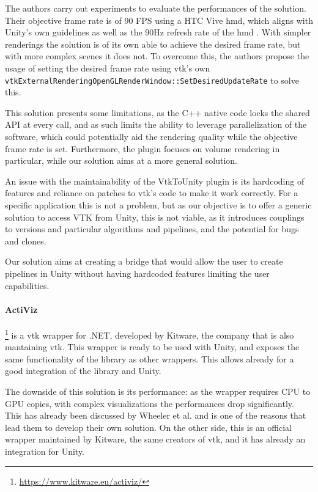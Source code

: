 The authors carry out experiments to evaluate the performances of the solution. Their objective frame rate is of 90 FPS using a HTC Vive \acrfull{hmd}, which aligns with Unity's own guidelines \cite{unity_vr_2020} as well as the 90Hz refresh rate of the \acrshort{hmd} \cite{BuyVIVEH54}. With simpler renderings the solution is of its own able to achieve the desired frame rate, but with more complex scenes it does not. To overcome this, the authors propose the usage of setting the desired frame rate using \acrshort{vtk}'s own \verb|vtkExternalRenderingOpenGLRenderWindow::SetDesiredUpdateRate| to solve this.

This solution presents some limitations, as the C++ native code locks the shared API at every call, and as such limits the ability to leverage parallelization of the software, which could potentially aid the rendering quality while the objective frame rate is set. Furthermore, the plugin focuses on volume rendering in particular, while our solution aims at a more general solution.

An issue with the maintainability of the VtkToUnity plugin is its hardcoding of features and reliance on patches to \acrshort{vtk}'s code to make it work correctly. For a specific application this is not a problem, but as our objective is to offer a generic solution to access VTK from Unity, this is not viable, as it introduces couplings to versions and particular algorithms and pipelines, and the potential for bugs and clones.

Our solution aims at creating a bridge that would allow the user to create pipelines in Unity without having hardcoded features limiting the user capabilities.

\paragraph{ActiViz}\footnote{\url{https://www.kitware.eu/activiz/}} is a \acrshort{vtk} wrapper for .NET, developed by Kitware, the company that is also mantaining \acrshort{vtk}. This wrapper is ready to be used with Unity, and exposes the same functionality of the library as other wrappers. This allows already for a good integration of the library and Unity.

The downside of this solution is its performance: as the wrapper requires CPU to GPU copies, with complex visualizations the performances drop significantly. This has already been discussed by Wheeler et al. \cite{wheeler_virtual_2018} and is one of the reasons that lead them to develop their own solution. On the other side, this is an official wrapper maintained by Kitware, the same creators of \acrshort{vtk}, and it has already an integration for Unity.

